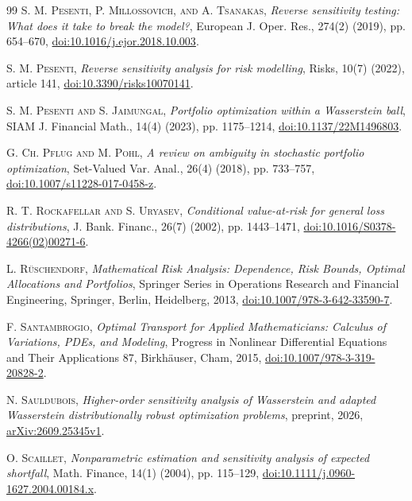 \begin{thebibliography}{99}
\textsc{S. M. Pesenti, P. Millossovich, and A. Tsanakas}, \emph{Reverse sensitivity testing: What does it take to break the model?}, European J. Oper. Res., 274(2) (2019), pp. 654--670, \href{https://doi.org/10.1016/j.ejor.2018.10.003}{doi:10.1016/j.ejor.2018.10.003}.

\textsc{S. M. Pesenti}, \emph{Reverse sensitivity analysis for risk modelling}, Risks, 10(7) (2022), article 141, \href{https://doi.org/10.3390/risks10070141}{doi:10.3390/risks10070141}.

\textsc{S. M. Pesenti and S. Jaimungal}, \emph{Portfolio optimization within a Wasserstein ball}, SIAM J. Financial Math., 14(4) (2023), pp. 1175--1214, \href{https://doi.org/10.1137/22M1496803}{doi:10.1137/22M1496803}.

\textsc{G. Ch. Pflug and M. Pohl}, \emph{A review on ambiguity in stochastic portfolio optimization}, Set-Valued Var. Anal., 26(4) (2018), pp. 733--757, \href{https://doi.org/10.1007/s11228-017-0458-z}{doi:10.1007/s11228-017-0458-z}.

\textsc{R. T. Rockafellar and S. Uryasev}, \emph{Conditional value-at-risk for general loss distributions}, J. Bank. Financ., 26(7) (2002), pp. 1443--1471, \href{https://doi.org/10.1016/S0378-4266(02)00271-6}{doi:10.1016/S0378-4266(02)00271-6}.

\textsc{L. R\"uschendorf}, \emph{Mathematical Risk Analysis: Dependence, Risk Bounds, Optimal Allocations and Portfolios}, Springer Series in Operations Research and Financial Engineering, Springer, Berlin, Heidelberg, 2013, \href{https://doi.org/10.1007/978-3-642-33590-7}{doi:10.1007/978-3-642-33590-7}.

\textsc{F. Santambrogio}, \emph{Optimal Transport for Applied Mathematicians: Calculus of Variations, PDEs, and Modeling}, Progress in Nonlinear Differential Equations and Their Applications 87, Birkh\"auser, Cham, 2015, \href{https://doi.org/10.1007/978-3-319-20828-2}{doi:10.1007/978-3-319-20828-2}.

\textsc{N. Sauldubois}, \emph{Higher-order sensitivity analysis of Wasserstein and adapted Wasserstein distributionally robust optimization problems}, preprint, 2026, \href{https://arxiv.org/abs/2609.25345v1}{arXiv:2609.25345v1}.

\textsc{O. Scaillet}, \emph{Nonparametric estimation and sensitivity analysis of expected shortfall}, Math. Finance, 14(1) (2004), pp. 115--129, \href{https://doi.org/10.1111/j.0960-1627.2004.00184.x}{doi:10.1111/j.0960-1627.2004.00184.x}.


\end{thebibliography}
